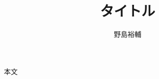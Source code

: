 \documentclass{jsarticle}
\title{タイトル}
\author{野島裕輔}
\begin{document}
\maketitle

本文

\bigskip
\nocite{*}

\end{document}
